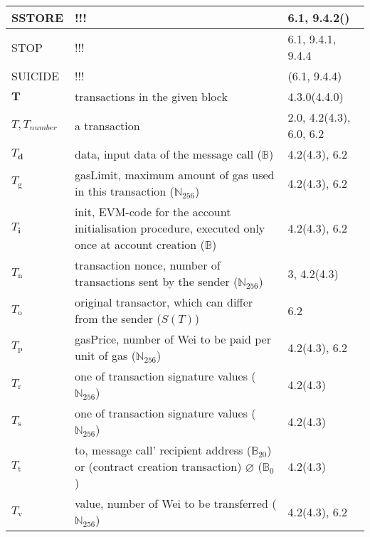 \documentclass[9pt,oneside]{amsart}
\newcommand{\reff}[1]{{\footnotesize #1}}
\begin{document}
\begin{longtabu}{X[1.2lm] X[3] X}
{\small SSTORE} &
!!! &
\reff{6.1, 9.4.2()} \\\hline

{\small STOP} &
!!! &
\reff{6.1, 9.4.1, 9.4.4} \\\hline

{\small SUICIDE} &
!!! &
\reff{(6.1, 9.4.4)} \\\hline

$\mathbf{T}$ &
transactions in the given block &
\reff{4.3.0(4.4.0)} \\\hline

$T, T_{number}$ &
a transaction &
\reff{2.0, 4.2(4.3), 6.0, 6.2} \\\hline

$T_{\mathbf{d}}$ &
data, input data of the message call ($\mathbb{B}$) &
\reff{4.2(4.3), 6.2} \\\hline

$T_{\mathrm{g}}$ &
gasLimit, maximum amount of gas used in this transaction ($\mathbb{N}_{256}$) &
\reff{4.2(4.3), 6.2} \\\hline

$T_{\mathbf{i}}$ &
init, EVM-code for the account initialisation procedure, executed only once at account creation ($\mathbb{B}$) &
\reff{4.2(4.3), 6.2} \\\hline

$T_{\mathrm{n}}$ &
transaction nonce, number of transactions sent by the sender ($\mathbb{N}_{256}$) &
\reff{3, 4.2(4.3)} \\\hline

$T_{\mathrm{o}}$ &
original transactor, which can differ from the sender ($S(T)$) &
\reff{6.2} \\\hline

$T_{\mathrm{p}}$ &
gasPrice, number of Wei to be paid per unit of gas ($\mathbb{N}_{256}$) &
\reff{4.2(4.3), 6.2} \\\hline

$T_{\mathrm{r}}$ &
one of transaction signature values ($\mathbb{N}_{256}$) &
\reff{4.2(4.3)} \\\hline

$T_{\mathrm{s}}$ &
one of transaction signature values ($\mathbb{N}_{256}$) &
\reff{4.2(4.3)} \\\hline

$T_{\mathrm{t}}$ &
to, message call' recipient address ($\mathbb{B}_{20}$) or (contract creation transaction) $\varnothing$ ($\mathbb{B}_0$) &
\reff{4.2(4.3)} \\\hline

$T_{\mathrm{v}}$ &
value, number of Wei to be transferred ($\mathbb{N}_{256}$) &
\reff{4.2(4.3), 6.2} \\\hline


\end{longtabu}
\end{document}
